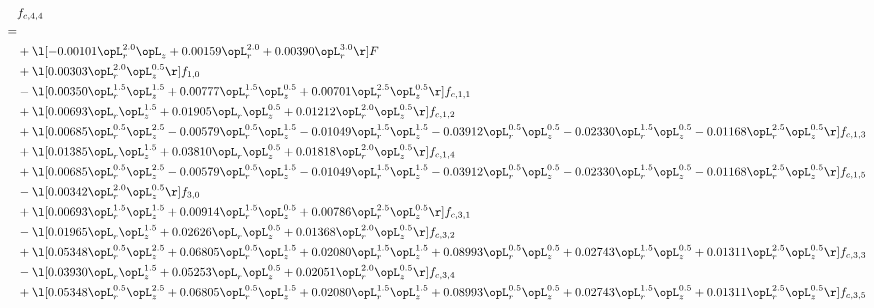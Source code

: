 \begin{alignat}{2} 
\label{eq:f_44_1} 
& f_{c,4,4} \nonumber \\ 
 = \\ 
& + \l[  -0.00101 \opL_r^{2.0} \opL_z +  0.00159 \opL_r^{2.0} +  0.00390 \opL_r^{3.0}  \r] F \nonumber \\ 
& + \l[  0.00303 \opL_r^{2.0} \opL_z^{0.5}  \r] f_{1,0} \nonumber \\ 
& - \l[  0.00350 \opL_r^{1.5} \opL_z^{1.5} +  0.00777 \opL_r^{1.5} \opL_z^{0.5} +  0.00701 \opL_r^{2.5} \opL_z^{0.5}  \r] f_{c,1,1} \nonumber \\ 
& + \l[  0.00693 \opL_r \opL_z^{1.5} +  0.01905 \opL_r \opL_z^{0.5} +  0.01212 \opL_r^{2.0} \opL_z^{0.5}  \r] f_{c,1,2} \nonumber \\ 
& + \l[  0.00685 \opL_r^{0.5} \opL_z^{2.5}   -0.00579 \opL_r^{0.5} \opL_z^{1.5}   -0.01049 \opL_r^{1.5} \opL_z^{1.5}   -0.03912 \opL_r^{0.5} \opL_z^{0.5}   -0.02330 \opL_r^{1.5} \opL_z^{0.5}   -0.01168 \opL_r^{2.5} \opL_z^{0.5}  \r] f_{c,1,3} \nonumber \\ 
& + \l[  0.01385 \opL_r \opL_z^{1.5} +  0.03810 \opL_r \opL_z^{0.5} +  0.01818 \opL_r^{2.0} \opL_z^{0.5}  \r] f_{c,1,4} \nonumber \\ 
& + \l[  0.00685 \opL_r^{0.5} \opL_z^{2.5}   -0.00579 \opL_r^{0.5} \opL_z^{1.5}   -0.01049 \opL_r^{1.5} \opL_z^{1.5}   -0.03912 \opL_r^{0.5} \opL_z^{0.5}   -0.02330 \opL_r^{1.5} \opL_z^{0.5}   -0.01168 \opL_r^{2.5} \opL_z^{0.5}  \r] f_{c,1,5} \nonumber \\ 
& - \l[  0.00342 \opL_r^{2.0} \opL_z^{0.5}  \r] f_{3,0} \nonumber \\ 
& + \l[  0.00693 \opL_r^{1.5} \opL_z^{1.5} +  0.00914 \opL_r^{1.5} \opL_z^{0.5} +  0.00786 \opL_r^{2.5} \opL_z^{0.5}  \r] f_{c,3,1} \nonumber \\ 
& - \l[  0.01965 \opL_r \opL_z^{1.5} +  0.02626 \opL_r \opL_z^{0.5} +  0.01368 \opL_r^{2.0} \opL_z^{0.5}  \r] f_{c,3,2} \nonumber \\ 
& + \l[  0.05348 \opL_r^{0.5} \opL_z^{2.5} +  0.06805 \opL_r^{0.5} \opL_z^{1.5} +  0.02080 \opL_r^{1.5} \opL_z^{1.5} +  0.08993 \opL_r^{0.5} \opL_z^{0.5} +  0.02743 \opL_r^{1.5} \opL_z^{0.5} +  0.01311 \opL_r^{2.5} \opL_z^{0.5}  \r] f_{c,3,3} \nonumber \\ 
& - \l[  0.03930 \opL_r \opL_z^{1.5} +  0.05253 \opL_r \opL_z^{0.5} +  0.02051 \opL_r^{2.0} \opL_z^{0.5}  \r] f_{c,3,4} \nonumber \\ 
& + \l[  0.05348 \opL_r^{0.5} \opL_z^{2.5} +  0.06805 \opL_r^{0.5} \opL_z^{1.5} +  0.02080 \opL_r^{1.5} \opL_z^{1.5} +  0.08993 \opL_r^{0.5} \opL_z^{0.5} +  0.02743 \opL_r^{1.5} \opL_z^{0.5} +  0.01311 \opL_r^{2.5} \opL_z^{0.5}  \r] f_{c,3,5} \nonumber \\ 

\end{alignat}
